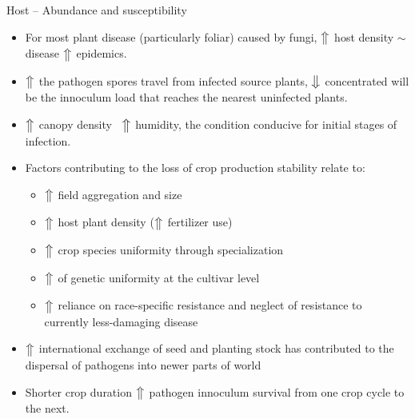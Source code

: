 \documentclass[11pt,dvipsnames,ignorenonframetext,aspectratio=169]{beamer}
\providecommand{\tightlist}{%
  \setlength{\itemsep}{0pt}\setlength{\parskip}{0pt}}
\begin{document}
\begin{frame}{Host -- Abundance and susceptibility}
\protect\hypertarget{host-abundance-and-susceptibility}{}
\small

\begin{itemize}
\tightlist
\item
  For most plant disease (particularly foliar) caused by fungi,
  \(\big\Uparrow\) host density \(\sim\) disease \(\big\Uparrow\)
  epidemics.
\item
  \(\big\Uparrow\) the pathogen spores travel from infected source
  plants, \(\big\Downarrow\) concentrated will be the innoculum load
  that reaches the nearest uninfected plants.
\item
  \(\big\Uparrow\) canopy density \(~\) \(\big\Uparrow\) humidity, the
  condition conducive for initial stages of infection.
\item
  Factors contributing to the loss of crop production stability relate
  to:

  \begin{itemize}
  \tightlist
  \item
    \(\big\Uparrow\) field aggregation and size
  \item
    \(\big\Uparrow\) host plant density (\(\big\Uparrow\) fertilizer
    use)
  \item
    \(\big\Uparrow\) crop species uniformity through specialization
  \item
    \(\big\Uparrow\) of genetic uniformity at the cultivar level
  \item
    \(\big\Uparrow\) reliance on race-specific resistance and neglect of
    resistance to currently less-damaging disease
  \end{itemize}
\item
  \(\big\Uparrow\) international exchange of seed and planting stock has
  contributed to the dispersal of pathogens into newer parts of world
\item
  Shorter crop duration \(\big\Uparrow\) pathogen innoculum survival
  from one crop cycle to the next.
\end{itemize}
\end{frame}
\end{document}
